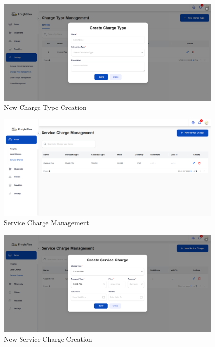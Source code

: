 \begin{figure}[H]
    \centering
    \includegraphics[width=15cm]{graphics/UI/new-charge-type.png}
    \caption{New Charge Type Creation}
    \label{fig:new-charge-type}
\end{figure}

\begin{figure}[H]
    \centering
    \includegraphics[width=15cm]{graphics/UI/service-charge-management.png}
    \caption{Service Charge Management}
    \label{fig:service-charge-management}
\end{figure}

\begin{figure}[H]
    \centering
    \includegraphics[width=15cm]{graphics/UI/new-service-charge.png}
    \caption{New Service Charge Creation}
    \label{fig:new-service-charge}
\end{figure}

